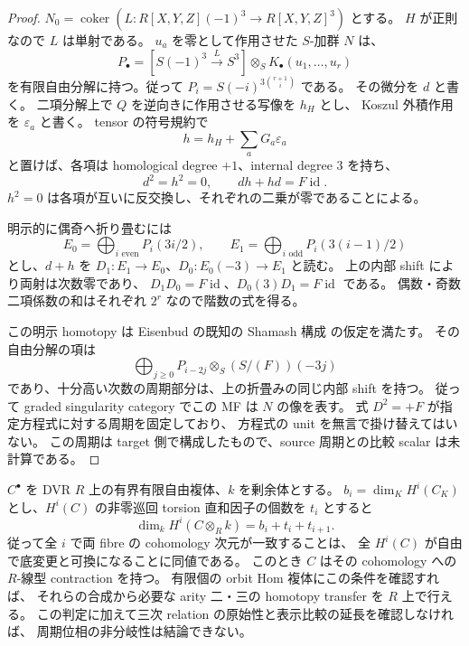 \begin{proof}
$N_0=\operatorname{coker}(L:R[X,Y,Z](-1)^3\to R[X,Y,Z]^3)$ とする。
$H$ が正則なので $L$ は単射である。
$u_a$ を零として作用させた $S$-加群 $N$ は、
\[
 P_\bullet=[S(-1)^3\xrightarrow{L}S^3]
                  \otimes_S K_\bullet(u_1,\ldots,u_r)
\]
を有限自由分解に持つ。従って
$P_i=S(-i)^{3\binom{r+1}{i}}$ である。
その微分を $d$ と書く。
二項分解上で $Q$ を逆向きに作用させる写像を $h_H$ とし、
Koszul 外積作用を $\varepsilon_a$ と書く。
tensor の符号規約で
\[
 h=h_H+\sum_aG_a\varepsilon_a
\]
と置けば、各項は homological degree $+1$、internal degree $3$ を持ち、
\[
 d^2=h^2=0,\qquad dh+hd=F\operatorname{id}.
\]
$h^2=0$ は各項が互いに反交換し、それぞれの二乗が零であることによる。

明示的に偶奇へ折り畳むには
\[
 E_0=\bigoplus_{i\text{ even}}P_i(3i/2),\qquad
 E_1=\bigoplus_{i\text{ odd}}P_i(3(i-1)/2)
\]
とし、$d+h$ を
$D_1:E_1\to E_0$、$D_0:E_0(-3)\to E_1$ と読む。
上の内部 shift により両射は次数零であり、
$D_1D_0=F\operatorname{id}$、$D_0(3)D_1=F\operatorname{id}$ である。
偶数・奇数二項係数の和はそれぞれ $2^r$ なので階数の式を得る。

この明示 homotopy は Eisenbud の既知の Shamash 構成
\cite[Theorem~7.2, pp.~56--57]{NFMEisenbudCI}の仮定を満たす。
その自由分解の項は
\[
 \bigoplus_{j\ge0}P_{i-2j}\otimes_S(S/(F))(-3j)
\]
であり、十分高い次数の周期部分は、上の折畳みの同じ内部 shift を持つ。
従って graded singularity category でこの MF は $N$ の像を表す。
式 $D^2=+F$ が指定方程式に対する周期を固定しており、
方程式の unit を無言で掛け替えてはいない。
この周期は target 側で構成したもので、source 周期との比較 scalar は未計算である。
\end{proof}

\begin{lemma}
\label{lem:nfm-boundary-hom-flatness-test}
$C^\bullet$ を DVR $R$ 上の有界有限自由複体、$k$ を剰余体とする。
$b_i=\dim_KH^i(C_K)$ とし、$H^i(C)$ の非零巡回 torsion 直和因子の個数を $t_i$ とすると
\[
 \dim_kH^i(C\otimes_Rk)=b_i+t_i+t_{i+1}.
\]
従って全 $i$ で両 fibre の cohomology 次元が一致することは、
全 $H^i(C)$ が自由で底変更と可換になることに同値である。
このとき $C$ はその cohomology への $R$-線型 contraction を持つ。
有限個の orbit Hom 複体にこの条件を確認すれば、
それらの合成から必要な arity 二・三の homotopy transfer を $R$ 上で行える。
この判定に加えて三次 relation の原始性と表示比較の延長を確認しなければ、
周期位相の非分岐性は結論できない。
\end{lemma}

